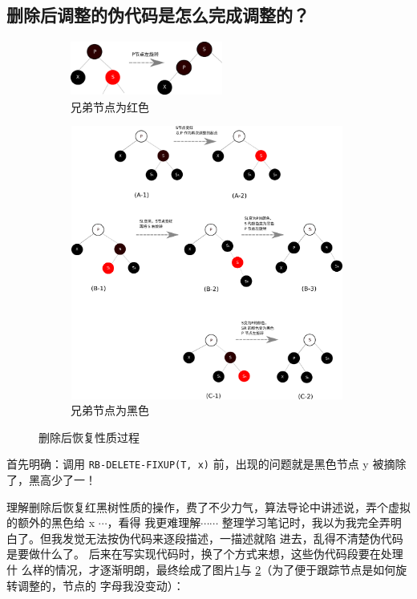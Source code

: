 \documentclass[a4paper, 11pt]{article}
\begin{document}
\subsection{删除后调整的伪代码是怎么完成调整的？}

\begin{figure}[h]
	\centering	
	\begin{subfigure}{0.5\textwidth}
		\centering
		\includegraphics[width=5cm, height=1.8cm]{images/delete_fixup_red_brother.png}
		\caption{兄弟节点为红色}
		\label{fig:delete:red:brother}
		\end {subfigure}
		
		\begin{subfigure}{\textwidth}
			\centering
			\includegraphics[width=9cm,height=9cm]{images/delete_fixup_black_brother_tree.png}
			\caption{兄弟节点为黑色}
			\label{fig:delete:black:brother}	
		\end{subfigure}
		
		\caption{删除后恢复性质过程}
		\label{fig:delete:fixup}
	\end{figure}

首先明确：调用 \verb|RB-DELETE-FIXUP(T, x)| 前，出现的问题就是黑色节点 y 被摘除了，黑高少了一！\par

理解删除后恢复红黑树性质的操作，费了不少力气，算法导论中讲述说，弄个虚拟的额外的黑色给 x $\cdots$，看得
我更难理解$\cdots\cdots$
整理学习笔记时，我以为我完全弄明白了。但我发觉无法按伪代码来逐段描述，一描述就陷
进去，乱得不清楚伪代码是要做什么了。
后来在写实现代码时，换了个方式来想，这些伪代码段要在处理什
么样的情况，才逐渐明朗，最终绘成了图片\ref{fig:delete:red:brother}与
\ref{fig:delete:black:brother}（为了便于跟踪节点是如何旋转调整的，节点的
字母我没变动）：
\end{document}
